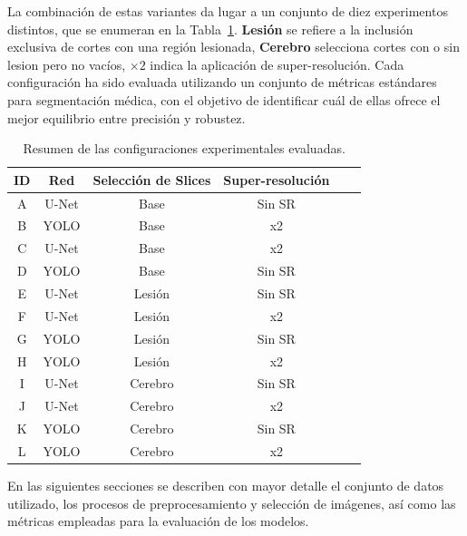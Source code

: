 \documentclass[../main.tex]{subfiles}
\begin{document}
La combinación de estas variantes da lugar a un conjunto de diez experimentos distintos, que se enumeran en la Tabla~\ref{tab:experimentos}. \textbf{Lesión} se refiere a la inclusión exclusiva de cortes con una región lesionada, \textbf{Cerebro} selecciona cortes con o sin lesion pero no vacíos, \textbf{$\times 2$} indica la aplicación de super-resolución. Cada configuración ha sido evaluada utilizando un conjunto de métricas estándares para segmentación médica, con el objetivo de identificar cuál de ellas ofrece el mejor equilibrio entre precisión y robustez.

\begin{table}[h]
\centering
\caption{Resumen de las configuraciones experimentales evaluadas.}
\label{tab:experimentos}
\begin{tabular}{cccccc}
\toprule
\textbf{ID} & \textbf{Red} & \textbf{Selección de Slices} & \textbf{Super-resolución} \\
\midrule
A & U-Net & Base                    & Sin SR \\
B & YOLO  & Base                    & x2     \\
C & U-Net & Base                    & x2     \\
D & YOLO  & Base                    & Sin SR \\
E & U-Net & Lesión                  & Sin SR \\
F & U-Net & Lesión                  & x2     \\
G & YOLO  & Lesión                  & Sin SR \\
H & YOLO  & Lesión                  & x2     \\
I & U-Net & Cerebro                 & Sin SR \\
J & U-Net & Cerebro                 & x2     \\
K & YOLO  & Cerebro                 & Sin SR \\
L & YOLO  & Cerebro                 & x2     \\
\bottomrule
\end{tabular}
\end{table}

En las siguientes secciones se describen con mayor detalle el conjunto de datos utilizado, los procesos de preprocesamiento y selección de imágenes, así como las métricas empleadas para la evaluación de los modelos.
\end{document}
